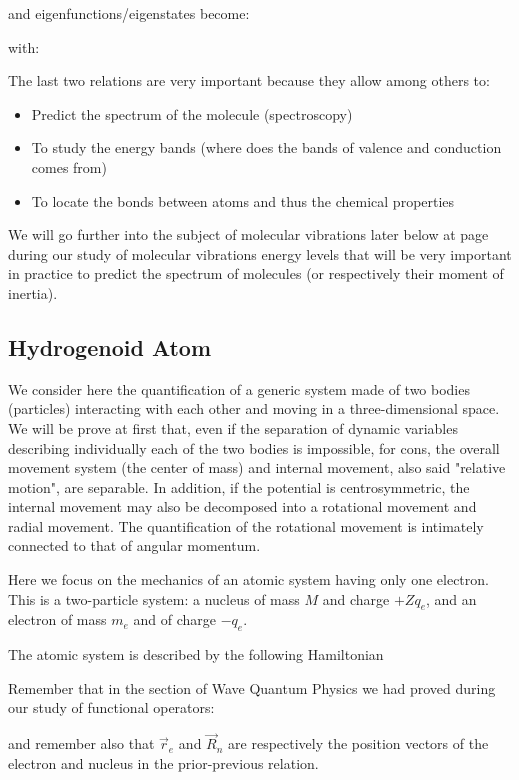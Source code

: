 	and eigenfunctions/eigenstates become:
	
	with:
	
	The last two relations are very important because they allow among others to:
	\begin{itemize}
		\item Predict the spectrum of the molecule (spectroscopy)
		\item To study the energy bands (where does the bands of valence and conduction comes from)
		\item To locate the bonds between atoms and thus the chemical properties
	\end{itemize}

	We will go further into the subject of molecular vibrations later below at page \pageref{molecular rotational energy levels} during our study of molecular vibrations energy levels that will be very important in practice to predict the spectrum of molecules (or respectively their moment of inertia).
	
	\subsection{Hydrogenoid Atom}
	We consider here the quantification of a generic system made of two bodies (particles) interacting with each other and moving in a three-dimensional space. We will be prove at first that, even if the separation of dynamic variables describing individually each of the two bodies is impossible, for cons, the overall movement system (the center of mass) and internal movement, also said "relative motion", are separable. In addition, if the potential is centrosymmetric, the internal movement may also be decomposed into a rotational movement and radial movement. The quantification of the rotational movement is intimately connected to that of angular momentum.
	
	Here we focus on the mechanics of an atomic system having only one electron. This is a two-particle system: a nucleus of mass $M$ and charge $+Zq_e$, and an electron of mass $m_e$ and of charge $-q_e$.
	
	The atomic system is described by the following Hamiltonian
	
	Remember that in the section of Wave Quantum Physics we had proved during our study of functional operators:
	
	and remember also that $\vec{r}_e$ and $\vec{R}_n$ are respectively the position vectors of the electron and nucleus in the prior-previous relation.
	
